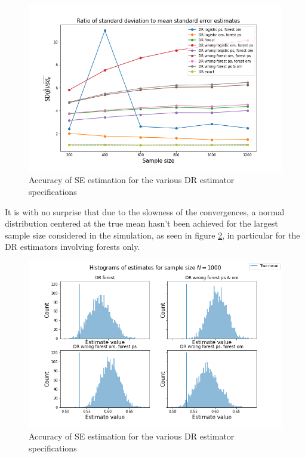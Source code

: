 \documentclass[12pt,twoside]{article}
\begin{document}
\begin{figure}[h!]
    \centering
    \includegraphics[width = 0.9\columnwidth]{figures/SERF_moreW.png}
    \caption{Accuracy of \citet{lunceford_davidian} SE estimation for the various DR estimator specifications}
    \label{figSERF_moreW}
\end{figure}

It is with no surprise that due to the slowness of the convergences, a normal distribution centered at the true mean hasn't been achieved for the largest sample size considered in the simulation, as seen in figure \ref{fighistRF_moreW}, in particular for the DR estimators involving forests only. 

\begin{figure}[h!]
    \centering
    \includegraphics[width = 0.9\columnwidth]{figures/histRF_moreW.png}
    \caption{Accuracy of \citet{lunceford_davidian} SE estimation for the various DR estimator specifications}
    \label{fighistRF_moreW}
\end{figure}
\end{document}
